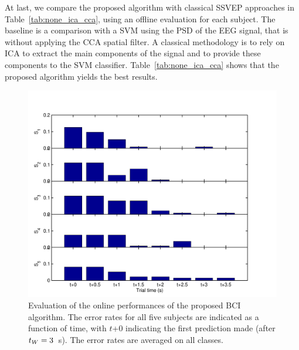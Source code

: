 At last, we compare the proposed algorithm with classical SSVEP approaches in Table~\ref{tab:none_ica_cca}, using an offline evaluation  for each subject. 
The baseline is a comparison with a SVM using the PSD of the EEG signal, that is without applying the CCA spatial filter.
A classical methodology is to rely on ICA to extract the main components of the signal and to provide these components to the SVM classifier.
Table~\ref{tab:none_ica_cca} shows that the proposed algorithm yields the best results.


\begin{figure}[!t]
    \centering
    \includegraphics[width=0.8\columnwidth]{Figures/error_rate.pdf}
    \caption{Evaluation of the online performances of the proposed BCI algorithm. The error rates for all five subjects are indicated as a function of time, with $t$+0 indicating the first prediction made (after $t_W = 3$~s). The error rates are averaged on all classes.}
    \label{fig:error_rate}
\end{figure}


